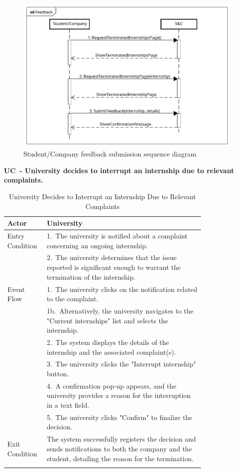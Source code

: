 \begin{figure}[H]
    \centering
    \includegraphics[width=1\linewidth]{Images/Sequence diagrams/Feedback.png}
    \caption{Student/Company feedback submission sequence diagram}
    \label{fig:enter-label}
\end{figure}

\newpage

\textbf{UC\cuc\  - University decides to interrupt an internship due to relevant complaints.}

\begin{center} 
    \renewcommand{\arraystretch}{1.2} 
    \begin{longtable}{ l p{0.8\linewidth} } 
        \hline 
        Actor & University \\ \hline 
        Entry Condition & 1.\ The university is notified about a complaint concerning an ongoing internship. \\ 
        & 2.\ The university determines that the issue reported is significant enough to warrant the termination of the internship. \\ \hline
        Event Flow &  1.\ The university clicks on the notification related to the complaint. \\ 
        & 1b.\ Alternatively, the university navigates to the "Current internships" list and selects the internship. \\ 
        & 2.\ The system displays the details of the internship and the associated complaint(s). \\ 
        & 3.\ The university clicks the "Interrupt internship" button. \\ 
        & 4.\ A confirmation pop-up appears, and the university provides a reason for the interruption in a text field. \\ 
        & 5.\ The university clicks "Confirm" to finalize the decision. \\ \hline 
        Exit Condition & The system successfully registers the decision and sends notifications to both the company and the student, detailing the reason for the termination. \\ \hline
        \caption{University Decides to Interrupt an Internship Due to Relevant Complaints} 
        \label{tab:university_interrupt_uc} 
    \end{longtable} 
\end{center}

